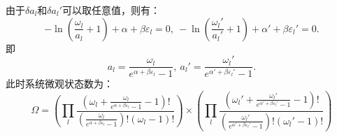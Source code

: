\documentclass[a4paper,12pt]{article}
\begin{document}
由于$\delta a_l$和$\delta a_l'$可以取任意值，则有：
\begin{equation}\nonumber
	-\ln \left( \frac{\omega_l}{a_l} + 1 \right) + \alpha + \beta\varepsilon_l = 0, ~ -\ln \left( \frac{\omega_l'}{a_l'} + 1 \right) + \alpha' + \beta \varepsilon_l' = 0.
\end{equation}
即
\begin{equation}\nonumber
	a_l = \frac{\omega_l}{e^{\alpha + \beta\varepsilon_l} - 1}, ~ a_l' = \frac{\omega_l'}{e^{\alpha' + \beta \varepsilon_l'} - 1}.
\end{equation}
此时系统微观状态数为：
\begin{equation}\nonumber
	\Omega = \left( \prod_l \frac{(\omega_l + \frac{\omega_l}{e^{\alpha+\beta\varepsilon_l} - 1} - 1)!}{(\frac{\omega_l}{e^{\alpha + \beta\varepsilon_l} - 1})! (\omega_l - 1)!} \right) \times \left( \prod_l \frac{(\omega_l' + \frac{\omega_l'}{e^{\alpha'+\beta\varepsilon_l'} - 1} - 1)!}{(\frac{\omega_l'}{e^{\alpha' + \beta\varepsilon_l'} - 1})! (\omega_l' - 1)!} \right)
\end{equation}
\end{document}

